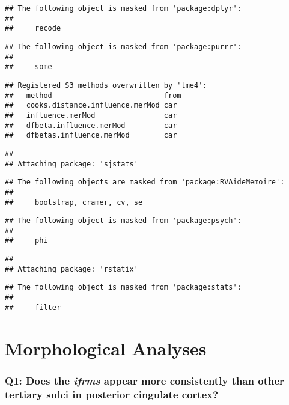 \documentclass[
]{article}
\begin{document}
\begin{verbatim}
## The following object is masked from 'package:dplyr':
## 
##     recode
\end{verbatim}

\begin{verbatim}
## The following object is masked from 'package:purrr':
## 
##     some
\end{verbatim}

\begin{verbatim}
## Registered S3 methods overwritten by 'lme4':
##   method                          from
##   cooks.distance.influence.merMod car 
##   influence.merMod                car 
##   dfbeta.influence.merMod         car 
##   dfbetas.influence.merMod        car
\end{verbatim}

\begin{verbatim}
## 
## Attaching package: 'sjstats'
\end{verbatim}

\begin{verbatim}
## The following objects are masked from 'package:RVAideMemoire':
## 
##     bootstrap, cramer, cv, se
\end{verbatim}

\begin{verbatim}
## The following object is masked from 'package:psych':
## 
##     phi
\end{verbatim}

\begin{verbatim}
## 
## Attaching package: 'rstatix'
\end{verbatim}

\begin{verbatim}
## The following object is masked from 'package:stats':
## 
##     filter
\end{verbatim}

\hypertarget{morphological-analyses}{%
\section{Morphological Analyses}\label{morphological-analyses}}

\hypertarget{q1-does-the-ifrms-appear-more-consistently-than-other-tertiary-sulci-in-posterior-cingulate-cortex}{%
\subsubsection{\texorpdfstring{Q1: Does the \emph{ifrms} appear more
consistently than other tertiary sulci in posterior cingulate
cortex?}{Q1: Does the ifrms appear more consistently than other tertiary sulci in posterior cingulate cortex?}}\label{q1-does-the-ifrms-appear-more-consistently-than-other-tertiary-sulci-in-posterior-cingulate-cortex}}
\end{document}
